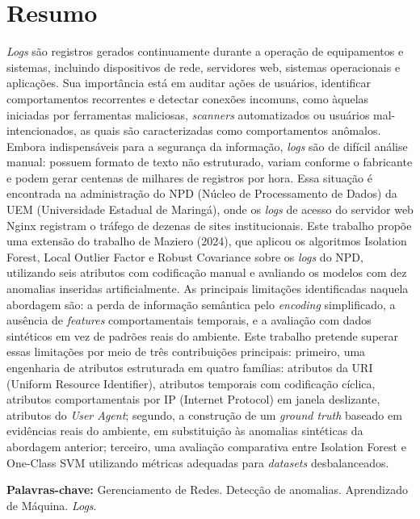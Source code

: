 \documentclass[12pt,a4paper]{report}
\begin{document}
\chapter*{Resumo}
\textit{Logs} são registros gerados continuamente durante a operação de equipamentos e sistemas,
incluindo dispositivos de rede, servidores web, sistemas operacionais e aplicações. Sua importância
está em auditar ações de usuários, identificar comportamentos recorrentes e detectar conexões
incomuns, como àquelas iniciadas por ferramentas maliciosas, \textit{scanners} automatizados ou usuários
mal-intencionados, as quais são caracterizadas como comportamentos anômalos. Embora
indispensáveis para a segurança da informação, \textit{logs} são de difícil análise manual: possuem formato
de texto não estruturado, variam conforme o fabricante e podem gerar centenas de milhares de
registros por hora. Essa situação é encontrada na administração do NPD (Núcleo de Processamento
de Dados) da UEM (Universidade Estadual de Maringá), onde os \textit{logs} de acesso do servidor web
Nginx registram o tráfego de dezenas de sites institucionais. Este trabalho propõe uma extensão do
trabalho de Maziero (2024), que aplicou os algoritmos Isolation Forest, Local Outlier Factor e
Robust Covariance sobre os \textit{logs} do NPD, utilizando seis atributos com codificação manual e
avaliando os modelos com dez anomalias inseridas artificialmente. As principais limitações
identificadas naquela abordagem são: a perda de informação semântica pelo \textit{encoding} simplificado,
a ausência de \textit{features} comportamentais temporais, e a avaliação com dados sintéticos em vez de
padrões reais do ambiente. Este trabalho pretende superar essas limitações por meio de três
contribuições principais: primeiro, uma engenharia de atributos estruturada em quatro famílias:
atributos da URI (Uniform Resource Identifier), atributos temporais com codificação cíclica,
atributos comportamentais por IP (Internet Protocol) em janela deslizante, atributos do \textit{User Agent};
segundo, a construção de um \textit{ground truth} baseado em evidências reais do ambiente, em substituição
às anomalias sintéticas da abordagem anterior; terceiro, uma avaliação comparativa entre Isolation
Forest e One-Class SVM utilizando métricas adequadas para \textit{datasets} desbalanceados.

\textbf{Palavras-chave:} Gerenciamento de Redes. Detecção de anomalias. Aprendizado de Máquina. \textit{Logs}.

\tableofcontents
\newpage
\end{document}
